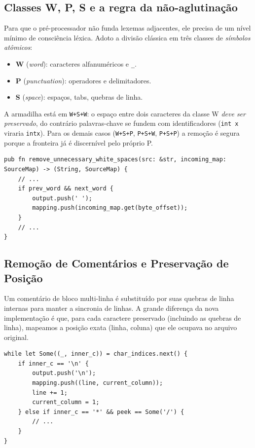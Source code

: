 \documentclass[12pt,a4paper]{article}
\begin{document}
\subsection{Classes W, P, S e a regra da não-aglutinação}

Para que o pré-processador não funda lexemas adjacentes, ele precisa de
um nível mínimo de consciência léxica. Adoto a divisão clássica em três
classes de \emph{símbolos atômicos}:

\begin{itemize}
  \item \textbf{W} (\emph{word}): caracteres alfanuméricos e \verb|_|.
  \item \textbf{P} (\emph{punctuation}): operadores e delimitadores.
  \item \textbf{S} (\emph{space}): espaços, tabs, quebras de linha.
\end{itemize}

A armadilha está em \texttt{W+S+W}: o espaço entre dois caracteres da
classe W \emph{deve ser preservado}, do contrário palavras-chave se
fundem com identificadores (\verb|int x| viraria \verb|intx|). Para os
demais casos (\texttt{W+S+P}, \texttt{P+S+W}, \texttt{P+S+P}) a remoção
é segura porque a fronteira já é discernível pelo próprio P.

\begin{lstlisting}[caption={Normalização de whitespace com SourceMap}]
pub fn remove_unnecessary_white_spaces(src: &str, incoming_map: SourceMap) -> (String, SourceMap) {
    // ...
    if prev_word && next_word {
        output.push(' ');
        mapping.push(incoming_map.get(byte_offset));
    }
    // ...
}
\end{lstlisting}

\subsection{Remoção de Comentários e Preservação de Posição}

Um comentário de bloco multi-linha é substituído por suas quebras de
linha internas para manter a sincronia de linhas. A grande diferença da
nova implementação é que, para cada caractere preservado (incluindo as
quebras de linha), mapeamos a posição exata (linha, coluna) que ele
ocupava no arquivo original.

\begin{lstlisting}[caption={Rastreamento em comentários de bloco}]
while let Some((_, inner_c)) = char_indices.next() {
    if inner_c == '\n' {
        output.push('\n');
        mapping.push((line, current_column));
        line += 1;
        current_column = 1;
    } else if inner_c == '*' && peek == Some('/') {
        // ...
    }
}
\end{lstlisting}
\end{document}
